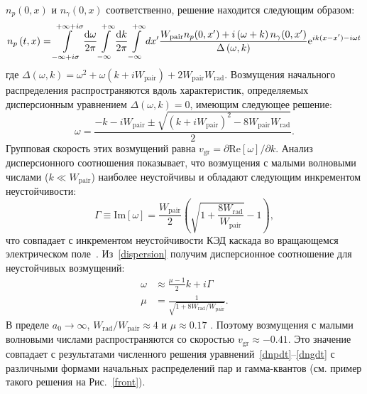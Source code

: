 $n_{p}\left(0,x\right)$ и $n_{\gamma}\left(0,x\right)$ соответственно, решение находится следующим образом:
\begin{equation}
    \label{np}
    n_{p}\left(t,x\right) = \intop_{-\infty+i\sigma}^{+\infty+i\sigma}\frac{\dd\omega}{2\pi}\intop_{-\infty}^{+\infty}\frac{\dd k}{2\pi}\intop_{-\infty}^{+\infty}dx' 
    \frac{W_\mathrm{pair}n_{p}(0,x')+i\left(\omega+k\right)n_{\gamma}(0,x')}{\Delta\left(\omega,k\right)} \mathrm{e}^{ik(x-x')-i\omega t}
\end{equation}
где $\Delta\left(\omega,k\right)=\omega^{2}+\omega(k + iW_\mathrm{pair})+2W_\mathrm{pair}W_\mathrm{rad}$. 
Возмущения начального распределения распространяются вдоль характеристик, определяемых дисперсионным уравнением $\Delta\left(\omega,k\right)=0$, имеющим следующее решение: 
\begin{equation}
    \label{dispersion}
    \omega=\frac{-k-i W_\mathrm{pair} \pm\sqrt{(k+i W_\mathrm{pair})^{2}-8 W_\mathrm{pair}W_\mathrm{rad}}}{2}. 
\end{equation}
Групповая скорость этих возмущений равна $v_\mathrm{gr}=\partial\mathrm{Re}[\omega]/\partial k$. 
Анализ дисперсионного соотношения показывает, что возмущения с малыми волновыми числами ($k\ll W_\mathrm{pair}$) наиболее неустойчивы и обладают следующим инкрементом неустойчивости:
\begin{equation}
    \Gamma \equiv \mathrm{Im}\left[\omega\right] =\frac{W_\mathrm{pair}}{2} \left(\sqrt{1+\frac{8 W_\mathrm{rad}}{W_\mathrm{pair}}}-1\right),
    \label{gamma}
\end{equation}
что совпадает с инкрементом неустойчивости КЭД каскада во вращающемся электрическом поле~\cite{bashmakov2014effect,grismayer2017seeded}. 
Из~\eqref{dispersion} получим дисперсионное соотношение для неустойчивых возмущений:
\begin{align}
    \omega & \approx  \frac{\mu-1}{2}k + i\Gamma \\
    \mu & =  \frac{1}{\sqrt{1+8 W_\mathrm{rad}/W_\mathrm{pair}}}.
    \label{omega}
\end{align} 
В пределе $a_0 \rightarrow \infty$, $W_\mathrm{rad}/W_\mathrm{pair} \approx 4$ и $\mu \approx0.17$ \cite{berestetskii1982quantum}. 
Поэтому возмущения с малыми волновыми числами распространяются со скоростью ${v_\mathrm{gr}\approx -0.41}$.
Это значение совпадает с результатами численного решения уравнений~\eqref{dnpdt}--\eqref{dngdt} с различными формами начальных распределений пар и гамма-квантов (см. пример такого решения на Рис.~\ref{front}).

